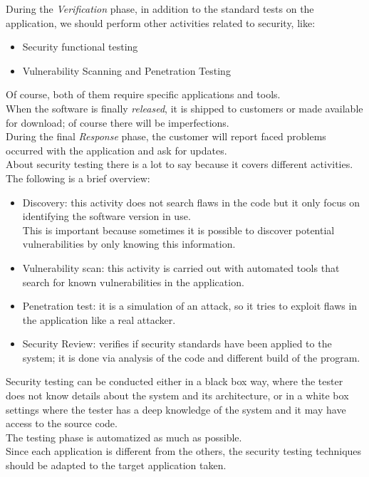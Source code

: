 \documentclass[12pt]{report}
\begin{document}
{During the \emph{Verification} phase, in addition to the standard tests on the application, we should perform other activities related to security, like:

\begin{itemize}
\setlength{\itemindent}{+4mm}
\item Security functional testing
\item Vulnerability Scanning and Penetration Testing
\end{itemize}

Of course, both of them require specific applications and tools.\\

When the software is finally \emph{released}, it is shipped to customers or made available for download; of course there will be imperfections.\\

During the final \emph{Response} phase, the customer will report faced problems occurred with the application and ask for updates.\\

About security testing there is a lot to say because it covers different activities. The following is a brief overview:

\begin{itemize}
  \item Discovery: this activity does not search flaws in the code but it only focus on identifying the software version in use.\\
This is important because sometimes it is possible to discover potential vulnerabilities by only knowing this information.
  \item Vulnerability scan: this activity is carried out with automated tools that search for
  known vulnerabilities in the application.
  \item Penetration test: it is a simulation of an attack, so it tries to exploit flaws in the application like a real attacker.
  \item Security Review: verifies if security standards have been applied to the system; it is done via analysis of the code and different build of the program.
\end{itemize}


Security testing can be conducted either in a black box way, where the tester does not know details about the system and its architecture, or
in a white box settings where the tester has a deep knowledge of the system and it may have access to the source code.\\
The testing phase is automatized as much as possible.\\
Since each application is different from the others, the security testing techniques should be adapted to the target application taken.

}
\end{document}
